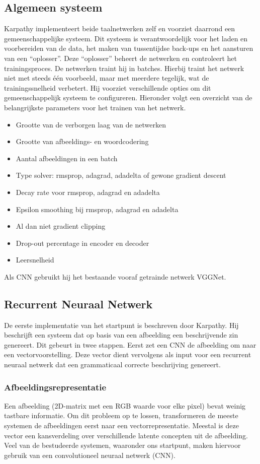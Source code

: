 \subsection{Algemeen systeem}
Karpathy implementeert beide taalnetwerken zelf en voorziet daarrond een gemeenschappelijke systeem. Dit systeem is verantwoordelijk voor het laden en voorbereiden van de data, het maken van tussentijdse back-ups en het aansturen van een ``oplosser''. Deze ``oplosser'' beheert de netwerken en controleert het trainingsproces. De netwerken traint hij in batches. Hierbij traint het netwerk niet met steeds \'e\'en voorbeeld, maar met meerdere tegelijk, wat de trainingssnelheid verbetert. 
Hij voorziet verschillende opties om dit gemeenschappelijk systeem te configureren. Hieronder volgt een overzicht van de belangrijkste parameters voor het trainen van het netwerk.
\begin{itemize}
	\item Grootte van de verborgen laag van de netwerken
	\item Grootte van afbeeldings- en woordcodering
	\item Aantal afbeeldingen in een batch
	\item Type solver: rmsprop, adagrad, adadelta of gewone gradient descent
	\item Decay rate voor rmsprop, adagrad en adadelta
	\item Epsilon smoothing bij rmsprop, adagrad en adadelta
	\item Al dan niet gradient clipping
	\item Drop-out percentage in encoder en decoder
	\item Leersnelheid
\end{itemize}
Als CNN gebruikt hij het bestaande vooraf getrainde netwerk VGGNet.

\subsection{Recurrent Neuraal Netwerk}
\label{sec:rnn_methodology}
De eerste implementatie van het startpunt is beschreven door Karpathy\cite{Karpathy2015}. Hij beschrijft een systeem dat op basis van een afbeelding een beschrijvende zin genereert. Dit gebeurt in twee stappen. Eerst zet een CNN de afbeelding om naar een vectorvoorstelling. Deze vector dient vervolgens als input voor een recurrent neuraal netwerk dat een grammaticaal correcte beschrijving genereert.

\subsubsection{Afbeeldingsrepresentatie}
\label{sec:usedcnn}
Een afbeelding (2D-matrix met een RGB waarde voor elke pixel) bevat weinig tastbare informatie. Om dit probleem op te lossen, transformeren de meeste systemen de afbeeldingen eerst naar een vectorrepresentatie. Meestal is deze vector een kansverdeling over verschillende latente concepten uit de afbeelding. Veel van de bestudeerde systemen, waaronder ons startpunt, maken hiervoor gebruik van een convolutioneel neuraal netwerk (CNN).

